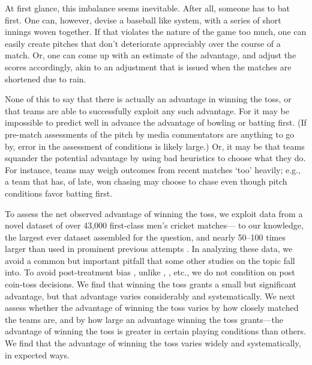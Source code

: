 \documentclass[12pt]{article}
\begin{document}
At first glance, this imbalance seems inevitable. After all, someone has to bat first. One can, however, devise a baseball like system, with a series of short innings woven together. If that violates the nature of the game too much, one can easily create pitches that don't deteriorate appreciably over the course of a match. Or, one can come up with an estimate of the advantage, and adjust the scores accordingly, akin to an adjustment that is issued when the matches are shortened due to rain.

None of this to say that there is actually an advantage in winning the toss, or that teams are able to successfully exploit any such advantage. For it may be impossible to predict well in advance the advantage of bowling or batting first. (If pre-match assessments of the pitch by media commentators are anything to go by, error in the assessment of conditions is likely large.) Or, it may be that teams squander the potential advantage by using bad heuristics to choose what they do. For instance, teams may weigh outcomes from recent matches `too' heavily; e.g., a team that has, of late, won chasing may choose to chase even though pitch conditions favor batting first.

To assess the net observed advantage of winning the toss, we exploit data from a novel dataset of over 43,000 first-class men's cricket matches--- to our knowledge, the largest ever dataset assembled for the question, and nearly 50--100 times larger than used in prominent previous attempts \citep[see,][]{dawson2009bat, de1998winning}. In analyzing these data, we avoid a common but important pitfall that some other studies on the topic fall into. To avoid post-treatment bias \citep[see][]{acharya2015}, unlike \citet{dawson2009bat}, \citet{Saad2015}, etc., we do not condition on post coin-toss decisions. We find that winning the toss grants a small but significant advantage, but that advantage varies considerably and systematically. We next assess whether the advantage of winning the toss varies by how closely matched the teams are, and by how large an advantage winning the toss grants---the advantage of winning the toss is greater in certain playing conditions than others. We find that the advantage of winning the toss varies widely and systematically, in expected ways.
\end{document}
